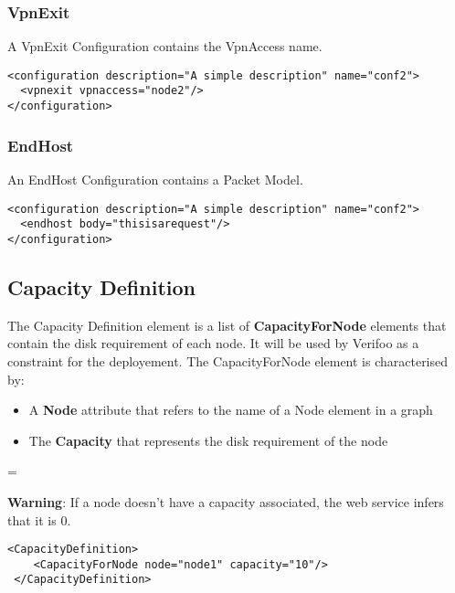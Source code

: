 \documentclass[a4paper,11pt]{article}
\newenvironment{warning}
  {\par\begin{mdframed}[backgroundcolor=mypink,linewidth=2pt,linecolor=red]%
    \begin{list}{}{\leftmargin=1cm
                   \labelwidth=\leftmargin}\item[\Large\ding{43}]}
  {\end{list}\end{mdframed}\par}
\begin{document}
\subsubsection*{VpnExit}
A VpnExit Configuration contains the VpnAccess name.
\begin{lstlisting}[label={list:fourteenth},caption=Vpn Exit Configuration Example]
<configuration description="A simple description" name="conf2">
  <vpnexit vpnaccess="node2"/>
</configuration>
\end{lstlisting}
\subsubsection*{EndHost}
An EndHost Configuration contains a Packet Model.
\begin{lstlisting}[label={list:fifteenth},caption=End Host Configuration Example]
<configuration description="A simple description" name="conf2">
  <endhost body="thisisarequest"/>
</configuration>
\end{lstlisting}

\subsection*{Capacity Definition}
The Capacity Definition element is a list of \textbf{CapacityForNode} elements that contain the disk requirement of each node. It will be used by Verifoo as a constraint for the deployement.
The CapacityForNode element is characterised by:
\begin{itemize}
    \item A \textbf{Node} attribute that refers to the name of a Node element in a graph
    \item The \textbf{Capacity} that represents the disk requirement of the node
\end{itemize}
\begin{warning}
\textbf{Warning}: If a node doesn't have a capacity associated, the web service infers that it is 0.
\end{warning}
\begin{lstlisting}[label={list:sixteenth},caption=Capacity Definition Example]
<CapacityDefinition>
   	<CapacityForNode node="node1" capacity="10"/>
 </CapacityDefinition>
\end{lstlisting}
\end{document}
